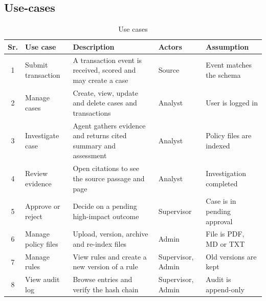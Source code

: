 \documentclass[oneside,a4paper,12pt]{report}
\begin{document}
\subsection{Use-cases}
\begin{table}[H]
\centering\small
\begin{tabularx}{\textwidth}{|c|l|X|l|X|}
\hline
\textbf{Sr.} & \textbf{Use case} & \textbf{Description} & \textbf{Actors} & \textbf{Assumption} \\ \hline
1 & Submit transaction & A transaction event is received, scored and may create a case & Source & Event matches the schema \\ \hline
2 & Manage cases & Create, view, update and delete cases and transactions & Analyst & User is logged in \\ \hline
3 & Investigate case & Agent gathers evidence and returns cited summary and assessment & Analyst & Policy files are indexed \\ \hline
4 & Review evidence & Open citations to see the source passage and page & Analyst & Investigation completed \\ \hline
5 & Approve or reject & Decide on a pending high-impact outcome & Supervisor & Case is in pending approval \\ \hline
6 & Manage policy files & Upload, version, archive and re-index files & Admin & File is PDF, MD or TXT \\ \hline
7 & Manage rules & View rules and create a new version of a rule & Supervisor, Admin & Old versions are kept \\ \hline
8 & View audit log & Browse entries and verify the hash chain & Supervisor, Admin & Audit is append-only \\ \hline
\end{tabularx}
\caption{Use cases}
\label{tab:usecase}
\end{table}
\end{document}
